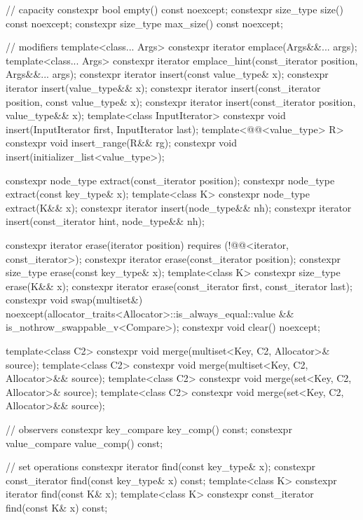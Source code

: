 \begin{codeblock}
{{    // capacity
    constexpr bool empty() const noexcept;
    constexpr size_type size() const noexcept;
    constexpr size_type max_size() const noexcept;

    // modifiers
    template<class... Args> constexpr iterator emplace(Args&&... args);
    template<class... Args>
      constexpr iterator emplace_hint(const_iterator position, Args&&... args);
    constexpr iterator insert(const value_type& x);
    constexpr iterator insert(value_type&& x);
    constexpr iterator insert(const_iterator position, const value_type& x);
    constexpr iterator insert(const_iterator position, value_type&& x);
    template<class InputIterator>
      constexpr void insert(InputIterator first, InputIterator last);
    template<@@<value_type> R>
      constexpr void insert_range(R&& rg);
    constexpr void insert(initializer_list<value_type>);

    constexpr node_type extract(const_iterator position);
    constexpr node_type extract(const key_type& x);
    template<class K> constexpr node_type extract(K&& x);
    constexpr iterator insert(node_type&& nh);
    constexpr iterator insert(const_iterator hint, node_type&& nh);

    constexpr iterator  erase(iterator position)
      requires (!@@<iterator, const_iterator>);
    constexpr iterator  erase(const_iterator position);
    constexpr size_type erase(const key_type& x);
    template<class K> constexpr size_type erase(K&& x);
    constexpr iterator  erase(const_iterator first, const_iterator last);
    constexpr void      swap(multiset&)
      noexcept(allocator_traits<Allocator>::is_always_equal::value &&
               is_nothrow_swappable_v<Compare>);
    constexpr void      clear() noexcept;

    template<class C2>
      constexpr void merge(multiset<Key, C2, Allocator>& source);
    template<class C2>
      constexpr void merge(multiset<Key, C2, Allocator>&& source);
    template<class C2>
      constexpr void merge(set<Key, C2, Allocator>& source);
    template<class C2>
      constexpr void merge(set<Key, C2, Allocator>&& source);

    // observers
    constexpr key_compare key_comp() const;
    constexpr value_compare value_comp() const;

    // set operations
    constexpr iterator       find(const key_type& x);
    constexpr const_iterator find(const key_type& x) const;
    template<class K> constexpr iterator       find(const K& x);
    template<class K> constexpr const_iterator find(const K& x) const;

}}
\end{codeblock}
